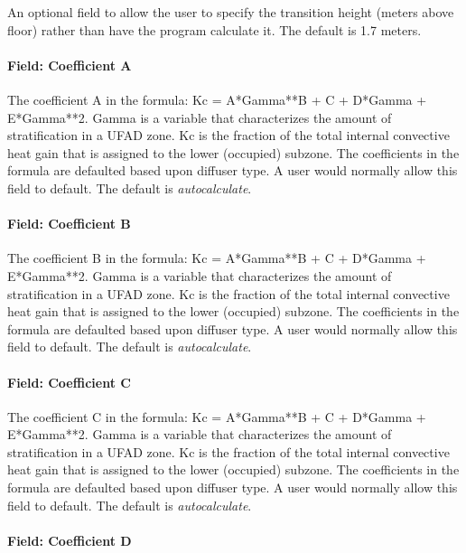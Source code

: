 An optional field to allow the user to specify the transition height (meters above floor) rather than have the program calculate it. The default is 1.7 meters.

\paragraph{Field: Coefficient A}\label{field-coefficient-a}

The coefficient A in the formula: Kc = A*Gamma**B + C + D*Gamma + E*Gamma**2. Gamma is a variable that characterizes the amount of stratification in a UFAD zone. Kc is the fraction of the total internal convective heat gain that is assigned to the lower (occupied) subzone. The coefficients in the formula are defaulted based upon diffuser type. A user would normally allow this field to default. The default is \emph{autocalculate}.

\paragraph{Field: Coefficient B}\label{field-coefficient-b}

The coefficient B in the formula: Kc = A*Gamma**B + C + D*Gamma + E*Gamma**2. Gamma is a variable that characterizes the amount of stratification in a UFAD zone. Kc is the fraction of the total internal convective heat gain that is assigned to the lower (occupied) subzone. The coefficients in the formula are defaulted based upon diffuser type. A user would normally allow this field to default. The default is \emph{autocalculate}.

\paragraph{Field: Coefficient C}\label{field-coefficient-c}

The coefficient C in the formula: Kc = A*Gamma**B + C + D*Gamma + E*Gamma**2. Gamma is a variable that characterizes the amount of stratification in a UFAD zone. Kc is the fraction of the total internal convective heat gain that is assigned to the lower (occupied) subzone. The coefficients in the formula are defaulted based upon diffuser type. A user would normally allow this field to default. The default is \emph{autocalculate}.

\paragraph{Field: Coefficient D}\label{field-coefficient-d}

